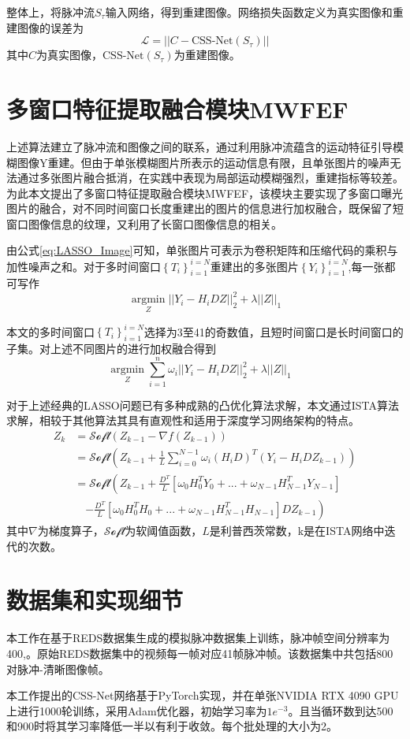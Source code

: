 整体上，将脉冲流$S_{\tau}$输入网络，得到重建图像。网络损失函数定义为真实图像和重建图像的误差为
\begin{equation}
    \mathcal{L} = ||C - \text{CSS-Net}(S_{\tau})||
    \label{eq:Loss_Function}
\end{equation}
其中$C$为真实图像，$\text{CSS-Net}(S_{\tau})$为重建图像。

\section{多窗口特征提取融合模块MWFEF}
上述算法建立了脉冲流和图像之间的联系，通过利用脉冲流蕴含的运动特征引导模糊图像Y重建。但由于单张模糊图片所表示的运动信息有限，且单张图片的噪声无法通过多张图片融合抵消，在实践中表现为局部运动模糊强烈，重建指标等较差。为此本文提出了多窗口特征提取融合模块MWFEF，该模块主要实现了多窗口曝光图片的融合，对不同时间窗口长度重建出的图片的信息进行加权融合，既保留了短窗口图像信息的纹理，又利用了长窗口图像信息的相关。

由公式\ref{eq:LASSO_Image}可知，单张图片可表示为卷积矩阵和压缩代码的乘积与加性噪声之和。对于多时间窗口$\left\{T_i\right\}_{i=1}^{i=N}$重建出的多张图片$\left\{Y_i\right\}_{i=1}^{i=N}$,每一张都可写作
\begin{equation}
    \mathop{\arg\min}\limits_{Z} ||Y_i-H_iDZ||_2^2 + \lambda||Z||_1
    \label{eq:LASSO_Image_expand}
\end{equation}

本文的多时间窗口$\left\{T_i\right\}_{i=1}^{i=N}$选择为3至41的奇数值，且短时间窗口是长时间窗口的子集。对上述不同图片的进行加权融合得到
\begin{equation}
    \mathop{\arg\min}\limits_{Z} \sum_{i=1}^{n} \omega_i||Y_i-H_iDZ||_2^2 + \lambda||Z||_1 \quad
    \label{eq:LASSO_Image_expand_fusion}
\end{equation}

对于上述经典的LASSO问题已有多种成熟的凸优化算法求解，本文通过ISTA算法求解，相较于其他算法其具有直观性和适用于深度学习网络架构的特点。
\begin{equation}
    \begin{aligned}
        Z_k & = \mathcal{Soft}(Z_{k - 1} - \nabla f(Z_{k-1}))                                                                    \\
            & = \mathcal{Soft}\left(Z_{k - 1} + \frac{1}{L}\sum_{i = 0}^{N - 1}\omega_i(H_iD)^T(Y_i - H_iDZ_{k - 1})\right)      \\
            & = \mathcal{Soft}\left(Z_{k - 1} + \frac{D^T}{L}[\omega_0H_0^TY_0 +... + \omega_{N-1}H_{N - 1}^TY_{N - 1}]\right.   \\
            & \quad\left.- \frac{D^T}{L}[\omega_0H_0^TH_0 +...+\omega_{N-1}H_{N - 1}^TH_{N - 1}]DZ_{k - 1}\right)\label{eq:ISTA}
    \end{aligned}
\end{equation}
其中$\nabla$为梯度算子，$\mathcal{Soft}$为软阈值函数，$L$是利普西茨常数，k是在ISTA网络中迭代的次数。

\section{数据集和实现细节}
本工作在基于REDS\cite{REDS}数据集生成的模拟脉冲数据集上训练，脉冲帧空间分辨率为400,。原始REDS数据集中的视频每一帧对应41帧脉冲帧。该数据集中共包括800对脉冲-清晰图像帧。

本工作提出的CSS-Net网络基于PyTorch实现，并在单张NVIDIA RTX 4090 GPU上进行1000轮训练，采用Adam优化器，初始学习率为$1e^{-3}$。且当循环数到达500和900时将其学习率降低一半以有利于收敛。每个批处理的大小为2。